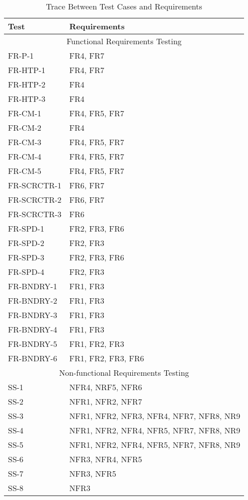 \documentclass[12pt, titlepage]{article}
\begin{document}
\begin{table}[H]
\centering
\begin{tabular}{p{} p{}}
\toprule
\textbf{Test} & \textbf{Requirements}\\
\midrule
\multicolumn{2}{c}{Functional Requirements Testing} \\
\midrule
FR-P-1 & FR4, FR7\\ 
FR-HTP-1 & FR4, FR7\\
FR-HTP-2  & FR4\\
FR-HTP-3  & FR4\\
FR-CM-1  & FR4, FR5, FR7\\
FR-CM-2 & FR4\\
FR-CM-3 & FR4, FR5, FR7\\
FR-CM-4 & FR4, FR5, FR7\\
FR-CM-5 & FR4, FR5, FR7\\
FR-SCRCTR-1 & FR6, FR7\\
FR-SCRCTR-2  & FR6, FR7\\
FR-SCRCTR-3  & FR6\\
FR-SPD-1  & FR2, FR3, FR6\\
FR-SPD-2  & FR2, FR3\\
FR-SPD-3 & FR2, FR3, FR6\\
FR-SPD-4 & FR2, FR3\\
FR-BNDRY-1 & FR1, FR3\\
FR-BNDRY-2 & FR1, FR3\\
FR-BNDRY-3 & FR1, FR3\\
FR-BNDRY-4 & FR1, FR3\\
FR-BNDRY-5 & FR1, FR2, FR3\\
FR-BNDRY-6 & FR1, FR2, FR3, FR6\\
\midrule
\multicolumn{2}{c}{Non-functional Requirements Testing} \\
\midrule
SS-1 & NFR4, NRF5, NFR6\\
SS-2 & NFR1, NFR2, NFR7\\
SS-3 & NFR1, NFR2, NFR3, NFR4, NFR7, NFR8, NR9\\
SS-4 & NFR1, NFR2, NFR4, NFR5, NFR7, NFR8, NR9\\
SS-5 & NFR1, NFR2, NFR4, NFR5, NFR7, NFR8, NR9\\
SS-6 & NFR3, NFR4, NFR5\\
SS-7 & NFR3, NFR5\\
SS-8 & NFR3\\
\bottomrule
\end{tabular}

\caption{Trace Between Test Cases and Requirements}
\label{TblRT}
\end{table}
		
\end{document}

